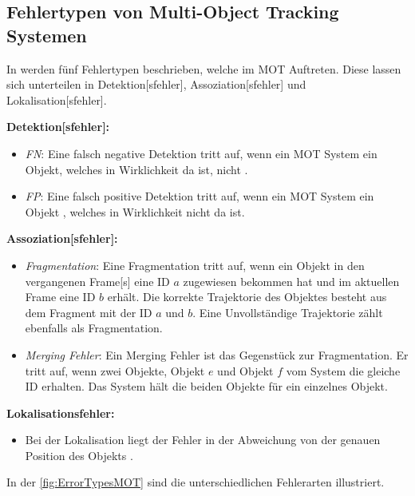 \subsection{Fehlertypen von Multi-Object Tracking Systemen} \label{sec:MOT Fehlertypen}
In \cite{Leichter.2013} werden fünf Fehlertypen beschrieben, welche im \gls{MOT} Auftreten. Diese lassen sich unterteilen in \gls{Detektion}[sfehler], \gls{Assoziation}[sfehler] und \gls{Lokalisation}[sfehler]. \par

\textbf{\gls{Detektion}[sfehler]:}
\begin{itemize}
    \item \textit{\gls{FN}}: Eine falsch negative \gls{Detektion} tritt auf, wenn ein \gls{MOT} System ein Objekt, welches in Wirklichkeit da ist, nicht .
    \item \textit{\gls{FP}}: Eine falsch positive \gls{Detektion} tritt auf, wenn ein \gls{MOT} System ein Objekt , welches in Wirklichkeit nicht da ist.
\end{itemize}

\textbf{\gls{Assoziation}[sfehler]:}
\begin{itemize}
    \item \textit{\gls{Fragmentation}}: Eine Fragmentation tritt auf, wenn ein Objekt in den vergangenen \gls{Frame}[s] eine \acrshort{ID} \(a\) zugewiesen bekommen hat und im aktuellen \gls{Frame} eine \acrshort{ID} \(b\) erhält. Die korrekte \gls{Trajektorie} des Objektes besteht aus dem Fragment mit der \acrshort{ID} \(a\) und \(b\). Eine Unvollständige \gls{Trajektorie} zählt ebenfalls als Fragmentation. 
    \item \textit{\gls{Merging Fehler}}: Ein Merging Fehler ist das Gegenstück zur Fragmentation. Er tritt auf, wenn zwei Objekte, Objekt \(e\) und Objekt \(f\) vom System die gleiche \acrshort{ID} erhalten. Das System hält die beiden Objekte für ein einzelnes Objekt. 
\end{itemize}

\textbf{\gls{Lokalisationsfehler}:}
\begin{itemize}
    \item Bei der \gls{Lokalisation} liegt der Fehler in der Abweichung von der genauen Position des Objekts \cite{Leichter.2013}. \par
\end{itemize}

In der \autoref{fig:ErrorTypesMOT} sind die unterschiedlichen Fehlerarten illustriert. 


